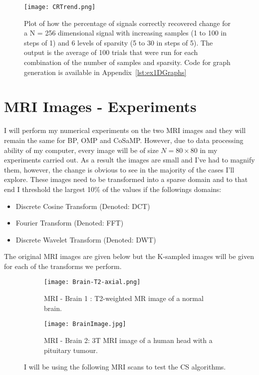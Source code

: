 \documentclass[titlepage,oneside, 12pt]{book}
\theoremstyle{break}
\begin{document}
\begin{figure}[H]
\centering
\centerline{\texttt{[image: CRTrend.png]}}
\caption{Plot of how the percentage of signals correctly recovered change for a N = 256 dimensional signal with increasing samples (1 to 100 in steps of 1) and 6 levels of sparsity (5 to 30 in steps of 5). The output is the average of 100 trials that were run for each combination of the number of samples and sparsity. Code for graph generation is available in Appendix~\ref{lst:ex1DGraphs}}
\label{fig:1DCorrect}
\end{figure}

\newpage

\section{MRI Images - Experiments}
I will perform my numerical experiments on the two MRI images and they will remain the same for BP, OMP and CoSaMP. However, due to data processing ability of my computer, every image will be of size $N = 80 \times 80$ in my experiments carried out. As a result the images are small and I've had to magnify them, however, the change is obvious to see in the majority of the cases I'll explore. These images need to be transformed into a sparse domain and to that end I threshold the largest 10\% of the values if the followings domains:

\begin{itemize}
\item Discrete Cosine Transform (Denoted: DCT)
\item Fourier Transform (Denoted: FFT)
\item Discrete Wavelet Transform (Denoted: DWT)
\end{itemize}  

The original MRI images are given below but the K-sampled images will be given for each of the transforms we perform.  

\begin{figure}[H]
\centering
\begin{subfigure}{.5\textwidth}
  \centering
  \texttt{[image: Brain-T2-axial.png]}
  \caption{MRI - Brain 1 : T2-weighted MR image of a normal brain\cite{Brain1}.}
  \label{fig:Brain1}
\end{subfigure}%
\hspace*{2em}
\begin{subfigure}{.5\textwidth}
  \centering
  \texttt{[image: BrainImage.jpg]}
  \caption{MRI - Brain 2: 3T MRI image of a human head with a pituitary tumour\cite{Brain2}.}
  \label{fig:Brain2}
\end{subfigure}
\caption{I will be using the following MRI scans to test the CS algorithms.}
\label{fig:MRIImages}
\end{figure}
\end{document}
